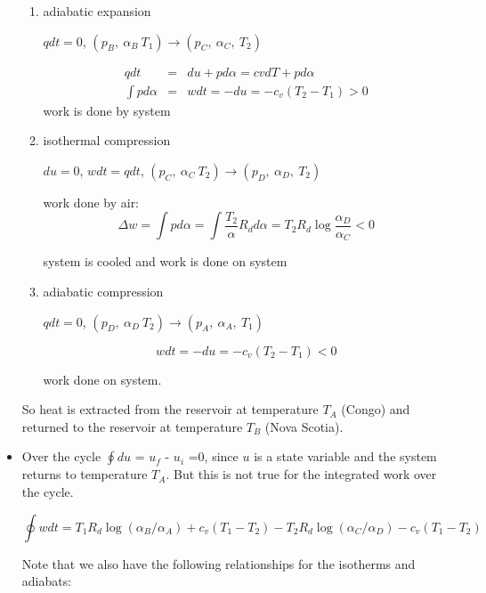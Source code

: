 \documentclass[12pt]{article}
\begin{document}
\begin{itemize}
\begin{enumerate}
\item adiabatic expansion
\par
$q dt=0$, $(p_B,\ \alpha_B\ T_1) \rightarrow (p_C,\ \alpha_C,\ T_2)$

\begin{eqnarray}
  \label{eq:s2work}
q dt &=& du + p d\alpha = cv dT + p d\alpha\\
\int p d\alpha &=& w dt = -du = -c_v (T_2 - T_1) > 0
\end{eqnarray}
work is done by system


\item isothermal compression
\par
$du=0$, $w dt = q dt$, $(p_C,\ \alpha_C\ T_2) \rightarrow (p_D,\ \alpha_D,\ T_2)$
\par
work done by air: 
\begin{equation}
  \label{eq:s3work}
\Delta w = \int p d \alpha = \int \frac{T_2}{\alpha} R_d d\alpha = T_2 R_d \log \frac{\alpha_D}{\alpha_C} < 0
\end{equation}
\par
system is cooled and work is done on system


\item adiabatic compression
\par
$q dt =0$, $(p_D,\ \alpha_D\ T_2) \rightarrow (p_A,\ \alpha_A,\ T_1)$

\begin{equation}
  \label{eq:s4work}
w dt = -du = -c_v (T_2 - T_1) < 0
\end{equation}
\par
work done on system.

\end{enumerate}

So heat is extracted from the reservoir at temperature $T_A$ (Congo) and returned to the
reservoir at temperature $T_B$ (Nova Scotia).


\item  Over the cycle $\oint du$ = $u_f$ - $u_i$ =0, since $u$ is a state variable and the
system returns to temperature $T_A$.  But this is not true for the integrated work
over the cycle.

\begin{equation}
  \label{eq:work}
  \oint w dt = T_1 R_d \log (\alpha_B/\alpha_A) + c_v (T_1 - T_2) - T_2 R_d \log (\alpha_C/\alpha_D) - c_v(T_1 - T_2)
\end{equation}

Note that we also have the following relationships for the isotherms and adiabats:


\end{itemize}
\end{document}

